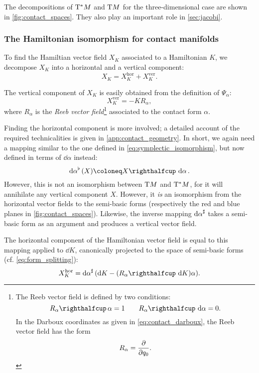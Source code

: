 The decompositions of $\mathrm{T}^*M$ and $\mathrm{T}M$ for the three-dimensional case are shown in \cref{fig:contact_spaces}. They also play an important role in \cref{sec:jacobi}.

\subsubsection{The Hamiltonian isomorphism for contact manifolds}
To find the Hamiltian vector field $X_K$ associated to a Hamiltonian $K$, we decompose $X_K$ into a horizontal and a vertical component:
$$ X_K = X_K^\text{hor} + X_K^\text{ver}. $$

The vertical component of $X_K$ is easily obtained from the definition of $\Psi_\alpha$:
\begin{equation}
    X_K^\text{ver} = -K R_\alpha,
    \label{eq:vertical_vf}
\end{equation}
where $R_\alpha$ is the \emph{Reeb vector field}\footnote{
    The Reeb vector field is defined by two conditions: \cite{Libermann1987}
        $$ \intpr{R_\alpha}{\alpha} = 1 \qquad \intpr{R_\alpha}{\dd{\alpha}} = 0.$$
    In the Darboux coordinates as given in \cref{eq:contact_darboux}, the Reeb vector field has the form
        $$ R_\alpha = \pdv{}{q_0}. $$} 
associated to the contact form $\alpha$.

Finding the horizontal component is more involved; a detailed account of the required technicalities is given in \cref{app:contact_geometry}. In short, we again need a mapping similar to the one defined in \cref{eq:symplectic_isomorphism}, but now defined in terms of $\dd{\alpha}$ instead:
\begin{equation}
    \toDual{\dd{\alpha}}(X) \coloneq \intpr{X}{\dd{\alpha}}.
    \label{eq:contact_isomorphism}
\end{equation}
However, this is not an isomorphism between $\mathrm{T}M$ and $\mathrm{T}^*M$, for it will annihilate any vertical component $X$. However, it \emph{is} an isomorphism from the horizontal vector fields to the semi-basic forms (respectively the red and blue planes in \cref{fig:contact_spaces}). Likewise, the inverse mapping $\dd{\alpha}^\sharp$ takes a semi-basic form as an argument and produces a vertical vector field. 

The horizontal component of the Hamiltonian vector field is equal to this mapping applied to $\dd{K}$, canonically projected to the space of semi-basic forms (cf. \cref{eq:form_splitting}):
\begin{equation}
    X_K^\text{hor} = \fromDual{\dd{\alpha}}\qty(\dd{K} - (\intpr{R_\alpha}{\dd{K}})\alpha).
    \label{eq:horizontal_vf}
\end{equation}

